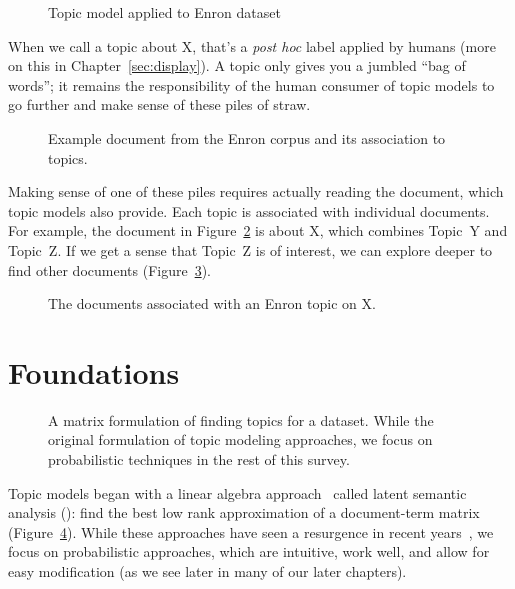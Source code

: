 \begin{figure}
  \caption{Topic model applied to Enron dataset}
  \label{fig:enron_topics}
\end{figure}


When we call a topic about X, that's a \textit{post hoc} label applied by humans
(more on this in Chapter~\ref{sec:display}).  A topic only gives you a jumbled
``bag of words''; it remains the responsibility of the human consumer of topic
models to go further and make sense of these piles of straw.

\begin{figure}
  \caption{Example document from the Enron corpus and its association to
    topics.}
  \label{fig:enron_doc}
\end{figure}

Making sense of one of these piles requires actually reading the document, which
topic models also provide.  Each topic is associated with individual documents.
For example, the document in Figure~\ref{fig:enron_doc} is about X, which
combines Topic~Y and Topic~Z.  If we get a sense that Topic~Z is of interest, we
can explore deeper to find other documents
(Figure~\ref{fig:enron_topic_allocation}).

\begin{figure}
  \caption{The documents associated with an Enron topic on X.}
  \label{fig:enron_topic_allocation}
\end{figure}

\section{Foundations}

\begin{figure}
  \caption{A matrix formulation of finding topics for a dataset.  While the
    original formulation of topic modeling approaches, we focus on probabilistic
    techniques in the rest of this survey.}
  \label{fig:matrix_topics}
\end{figure}

Topic models began with a linear algebra approach~\citep{deerwester-90} called
latent semantic analysis (): find the best low rank approximation of a
document-term matrix (Figure~\ref{fig:matrix_topics}).  While these approaches
have seen a resurgence in recent years~\citep{anandkumar-12:lda,arora-13}, we
focus on probabilistic approaches, which are intuitive, work well, and allow for
easy modification (as we see later in many of our later chapters).

